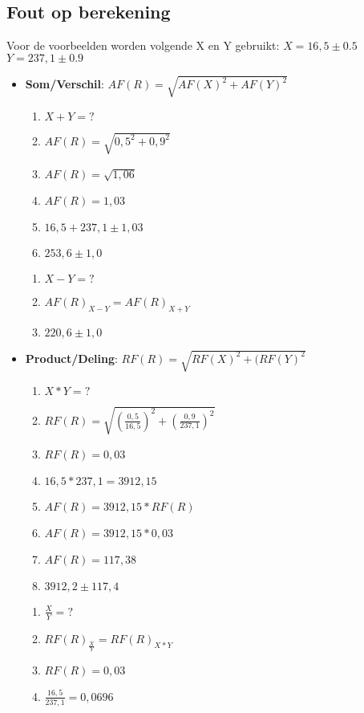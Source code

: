 \documentclass[12pt]{report}
\newcommand{\important}[1] {\textbf{\color{orange}#1}}
\begin{document}
\subsection{Fout op berekening}
Voor de voorbeelden worden volgende X en Y gebruikt: \newline
$X = 16,5 \pm 0.5 $
\newline
$Y = 237,1 \pm 0.9 $
\begin{itemize}
 \item \important{Som/Verschil}: $AF(R) = \sqrt{AF(X)^2 + AF(Y)^2}$
 \begin{enumerate}
  \item $X + Y = ?$
  \item $AF(R) = \sqrt{0,5^2 + 0,9^2}$
  \item $AF(R) = \sqrt{1,06}$
  \item $AF(R) = 1,03$
  \item $16,5 + 237,1 \pm 1,03$
  \item \important{$253,6 \pm 1,0$}
 \end{enumerate}
 \begin{enumerate}
  \item $X - Y = ?$
  \item $AF(R)_{X-Y} = AF(R)_{X+Y}$ 
  \item \important{$220,6 \pm 1,0$}
 \end{enumerate}
 \item \important{Product/Deling}: $RF(R) = \sqrt{RF(X)^2 + (RF(Y)^2}$
  \begin{enumerate}
   \item $X * Y = ?$
   \item $RF(R) = \sqrt{(\frac{0,5}{16,5})^2 + (\frac{0,9}{237,1})^2}$
   \item $RF(R) = 0,03$
   \item $16,5 * 237,1 = 3912,15$
   \item $AF(R) = 3912,15 * RF(R)$
   \item $AF(R) = 3912,15 * 0,03$
   \item $AF(R) = 117,38$
   \item \important{$3912,2 \pm 117,4$}
  \end{enumerate}
  \begin{enumerate}
   \item $\frac{X}{Y} = ?$
   \item $RF(R)_{\frac{X}{Y}} = RF(R)_{X * Y}$
   \item $RF(R) = 0,03$
   \item $\frac{16,5}{237,1} = 0,0696$

\end{enumerate}
\end{itemize}
\end{document}
